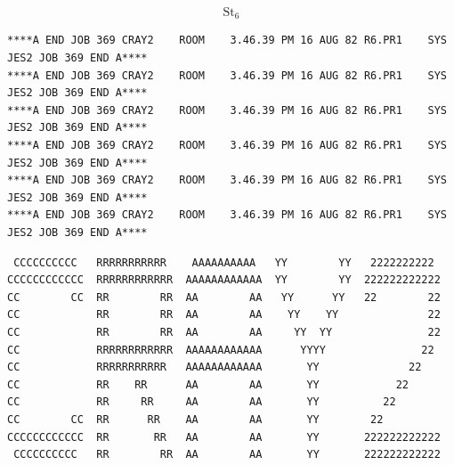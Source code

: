 \[\mathrm{St}_6\]
\begin{verbatim}
****A END JOB 369 CRAY2    ROOM    3.46.39 PM 16 AUG 82 R6.PR1    SYS JES2 JOB 369 END A****
****A END JOB 369 CRAY2    ROOM    3.46.39 PM 16 AUG 82 R6.PR1    SYS JES2 JOB 369 END A****
****A END JOB 369 CRAY2    ROOM    3.46.39 PM 16 AUG 82 R6.PR1    SYS JES2 JOB 369 END A****
****A END JOB 369 CRAY2    ROOM    3.46.39 PM 16 AUG 82 R6.PR1    SYS JES2 JOB 369 END A****
****A END JOB 369 CRAY2    ROOM    3.46.39 PM 16 AUG 82 R6.PR1    SYS JES2 JOB 369 END A****
****A END JOB 369 CRAY2    ROOM    3.46.39 PM 16 AUG 82 R6.PR1    SYS JES2 JOB 369 END A****
\end{verbatim}
\begin{verbatim}
 CCCCCCCCCC   RRRRRRRRRRR    AAAAAAAAAA   YY        YY   2222222222
CCCCCCCCCCCC  RRRRRRRRRRRR  AAAAAAAAAAAA  YY        YY  222222222222
CC        CC  RR        RR  AA        AA   YY      YY   22        22
CC            RR        RR  AA        AA    YY    YY              22
CC            RR        RR  AA        AA     YY  YY               22
CC            RRRRRRRRRRRR  AAAAAAAAAAAA      YYYY               22
CC            RRRRRRRRRRR   AAAAAAAAAAAA       YY              22
CC            RR    RR      AA        AA       YY            22
CC            RR     RR     AA        AA       YY          22
CC        CC  RR      RR    AA        AA       YY        22
CCCCCCCCCCCC  RR       RR   AA        AA       YY       222222222222
 CCCCCCCCCC   RR        RR  AA        AA       YY       222222222222
\end{verbatim}

